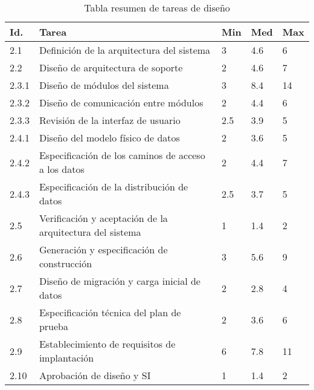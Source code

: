 \documentclass[11pt,a4paper,spanish,twoside]{report}
\begin{document}
\begin{table}[!h]
\centering
  \begin{tabular}{|p{0.8cm}||p{8cm}||p{0.75cm}|p{0.75cm}|p{0.75cm}|}
    \hline
    \textbf{Id.} & \textbf{Tarea} & \textbf{Min} &
    \textbf{Med} & \textbf{Max}\\
    \hline
    2.1 & Definición de la arquitectura del sistema & 3 & 4.6 & 6 \\
    \hline
    2.2 & Diseño de arquitectura de soporte & 2 & 4.6 & 7 \\
    \hline
    2.3.1 & Diseño de módulos del sistema & 3 & 8.4 & 14 \\
    \hline
    2.3.2 & Diseño de comunicación entre módulos & 2 & 4.4 & 6 \\
    \hline
    2.3.3 & Revisión de la interfaz de usuario &2.5 & 3.9 & 5 \\
    \hline
    2.4.1 & Diseño del modelo físico de datos & 2 & 3.6 & 5 \\
    \hline
    2.4.2 & Especificación de los caminos de acceso a los datos & 2 & 4.4 &
    7\\
    \hline
    2.4.3 & Especificación de la distribución de datos & 2.5 & 3.7 & 5 \\
    \hline
    2.5 & Verificación y aceptación de la arquitectura del sistema & 1 & 1.4
    & 2 \\
    \hline
    2.6 & Generación y especificación de construcción & 3 & 5.6 & 9 \\
    \hline
    2.7 & Diseño de migración y carga inicial de datos & 2 & 2.8 & 4 \\
    \hline
    2.8 & Especificación técnica del plan de prueba & 2 & 3.6 & 6 \\
    \hline
    2.9 & Establecimiento de requisitos de implantación & 6 & 7.8 & 11 \\
    \hline
    2.10 & Aprobación de diseño y SI & 1 & 1.4 & 2 \\
    \hline
  \end{tabular}
  \caption{Tabla resumen de tareas de diseño} \label{Tab:tareas2}
\end{table}
\end{document}
